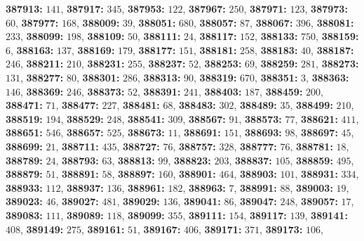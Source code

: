\textsf{\bfseries 387913:} $141$, \textsf{\bfseries 387917:} $345$, \textsf{\bfseries 387953:} $122$, \textsf{\bfseries 387967:} $250$, \textsf{\bfseries 387971:} $123$, \textsf{\bfseries 387973:} $60$, \textsf{\bfseries 387977:} $168$, \textsf{\bfseries 388009:} $39$, \textsf{\bfseries 388051:} $680$, \textsf{\bfseries 388057:} $87$, \textsf{\bfseries 388067:} $396$, \textsf{\bfseries 388081:} $233$, \textsf{\bfseries 388099:} $198$, \textsf{\bfseries 388109:} $50$, \textsf{\bfseries 388111:} $24$, \textsf{\bfseries 388117:} $152$, \textsf{\bfseries 388133:} $750$, \textsf{\bfseries 388159:} $6$, \textsf{\bfseries 388163:} $137$, \textsf{\bfseries 388169:} $179$, \textsf{\bfseries 388177:} $151$, \textsf{\bfseries 388181:} $258$, \textsf{\bfseries 388183:} $40$, \textsf{\bfseries 388187:} $246$, \textsf{\bfseries 388211:} $210$, \textsf{\bfseries 388231:} $255$, \textsf{\bfseries 388237:} $52$, \textsf{\bfseries 388253:} $69$, \textsf{\bfseries 388259:} $281$, \textsf{\bfseries 388273:} $131$, \textsf{\bfseries 388277:} $80$, \textsf{\bfseries 388301:} $286$, \textsf{\bfseries 388313:} $90$, \textsf{\bfseries 388319:} $670$, \textsf{\bfseries 388351:} $3$, \textsf{\bfseries 388363:} $146$, \textsf{\bfseries 388369:} $246$, \textsf{\bfseries 388373:} $52$, \textsf{\bfseries 388391:} $241$, \textsf{\bfseries 388403:} $187$, \textsf{\bfseries 388459:} $200$, \textsf{\bfseries 388471:} $71$, \textsf{\bfseries 388477:} $227$, \textsf{\bfseries 388481:} $68$, \textsf{\bfseries 388483:} $302$, \textsf{\bfseries 388489:} $35$, \textsf{\bfseries 388499:} $210$, \textsf{\bfseries 388519:} $194$, \textsf{\bfseries 388529:} $248$, \textsf{\bfseries 388541:} $309$, \textsf{\bfseries 388567:} $91$, \textsf{\bfseries 388573:} $77$, \textsf{\bfseries 388621:} $411$, \textsf{\bfseries 388651:} $546$, \textsf{\bfseries 388657:} $525$, \textsf{\bfseries 388673:} $11$, \textsf{\bfseries 388691:} $151$, \textsf{\bfseries 388693:} $98$, \textsf{\bfseries 388697:} $45$, \textsf{\bfseries 388699:} $21$, \textsf{\bfseries 388711:} $435$, \textsf{\bfseries 388727:} $76$, \textsf{\bfseries 388757:} $328$, \textsf{\bfseries 388777:} $76$, \textsf{\bfseries 388781:} $18$, \textsf{\bfseries 388789:} $24$, \textsf{\bfseries 388793:} $63$, \textsf{\bfseries 388813:} $99$, \textsf{\bfseries 388823:} $203$, \textsf{\bfseries 388837:} $105$, \textsf{\bfseries 388859:} $495$, \textsf{\bfseries 388879:} $51$, \textsf{\bfseries 388891:} $58$, \textsf{\bfseries 388897:} $160$, \textsf{\bfseries 388901:} $464$, \textsf{\bfseries 388903:} $101$, \textsf{\bfseries 388931:} $334$, \textsf{\bfseries 388933:} $112$, \textsf{\bfseries 388937:} $136$, \textsf{\bfseries 388961:} $182$, \textsf{\bfseries 388963:} $7$, \textsf{\bfseries 388991:} $88$, \textsf{\bfseries 389003:} $19$, \textsf{\bfseries 389023:} $46$, \textsf{\bfseries 389027:} $481$, \textsf{\bfseries 389029:} $136$, \textsf{\bfseries 389041:} $86$, \textsf{\bfseries 389047:} $248$, \textsf{\bfseries 389057:} $17$, \textsf{\bfseries 389083:} $111$, \textsf{\bfseries 389089:} $118$, \textsf{\bfseries 389099:} $355$, \textsf{\bfseries 389111:} $154$, \textsf{\bfseries 389117:} $139$, \textsf{\bfseries 389141:} $408$, \textsf{\bfseries 389149:} $275$, \textsf{\bfseries 389161:} $51$, \textsf{\bfseries 389167:} $406$, \textsf{\bfseries 389171:} $371$, \textsf{\bfseries 389173:} $106$, 
